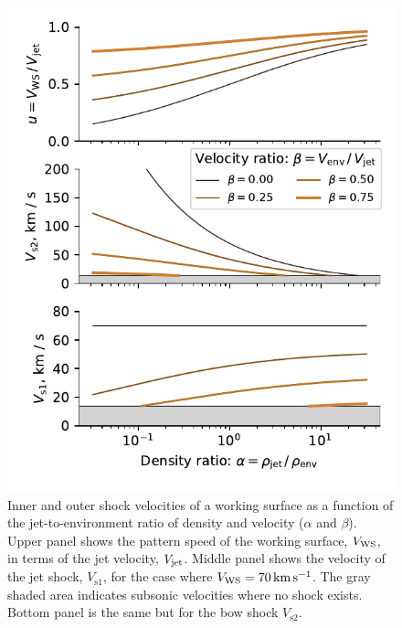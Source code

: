 \documentclass[useAMS, usenatbib]{mnras}
\begin{document}
\begin{figure}
  \centering
  \includegraphics[width=\linewidth]{shock-velocities}
  \caption{Inner and outer shock velocities of a working surface
    as a function of the jet-to-environment ratio of density and velocity
    (\(\alpha\) and \(\beta\)).
    Upper panel shows the pattern speed of the working surface, \(V_{\mathrm{WS}}\),
    in terms of the jet velocity, \(V_{\mathrm{jet}}\).
    Middle panel shows the velocity of the jet shock, \(V_{\mathrm{s1}}\),
    for the case where \(V_{\mathrm{WS}} = \SI{70}{km.s^{-1}}\).
    The gray shaded area indicates subsonic velocities where no shock exists. 
    Bottom panel is the same but for the bow shock \(V_{\mathrm{s2}}\).
  }
  
  \label{fig:shock-velocities}
\end{figure}
\end{document}
